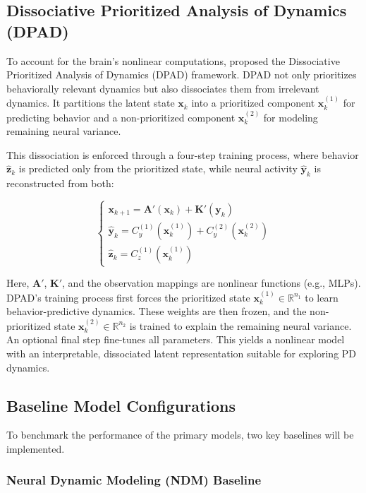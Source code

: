 \documentclass[12pt, a4paper]{article}
\begin{document}
\subsection{Dissociative Prioritized Analysis of Dynamics (DPAD)}

To account for the brain's nonlinear computations, \textcite{saniDissociativePrioritizedModeling2024} proposed the Dissociative Prioritized Analysis of Dynamics (DPAD) framework. DPAD not only prioritizes behaviorally relevant dynamics but also dissociates them from irrelevant dynamics. It partitions the latent state $\mathbf{x}_k$ into a prioritized component $\mathbf{x}_k^{(1)}$ for predicting behavior and a non-prioritized component $\mathbf{x}_k^{(2)}$ for modeling remaining neural variance.

This dissociation is enforced through a four-step training process, where behavior $\hat{\mathbf{z}}_k$ is predicted only from the prioritized state, while neural activity $\hat{\mathbf{y}}_k$ is reconstructed from both:

$$
    \begin{cases}
        \mathbf{x}_{k+1} = \mathbf{A}'(\mathbf{x}_k) + \mathbf{K}'(\mathbf{y}_k)           \\
        \hat{\mathbf{y}}_k = C_y^{(1)}(\mathbf{x}_k^{(1)}) + C_y^{(2)}(\mathbf{x}_k^{(2)}) \\
        \hat{\mathbf{z}}_k = C_z^{(1)}(\mathbf{x}_k^{(1)})
    \end{cases}
$$

Here, $\mathbf{A}'$, $\mathbf{K}'$, and the observation mappings are nonlinear functions (e.g., MLPs). DPAD's training process first forces the prioritized state $\mathbf{x}_k^{(1)} \in \mathbb{R}^{n_1}$ to learn behavior-predictive dynamics. These weights are then frozen, and the non-prioritized state $\mathbf{x}_k^{(2)} \in \mathbb{R}^{n_2}$ is trained to explain the remaining neural variance. An optional final step fine-tunes all parameters. This yields a nonlinear model with an interpretable, dissociated latent representation suitable for exploring PD dynamics.


\subsection{Baseline Model Configurations}
To benchmark the performance of the primary models, two key baselines will be implemented.

\subsubsection{Neural Dynamic Modeling (NDM) Baseline}
\end{document}
